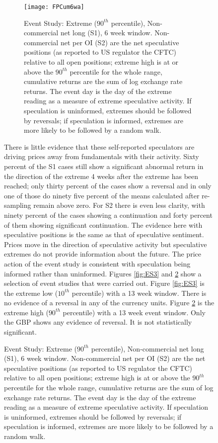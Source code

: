 \documentclass[ijfs,article,submit,oneauthor,pdftex,10pt,a4paper]{mdpi}
\begin{document}
{\begin{figure}
\begin{figure}
\graphicspath{{../Figures/}}
\centering
\texttt{[image: FPCum6wa]}
\caption{Event Study:  Extreme ($90^{th}$ percentile), Non-commercial net long (S1), 6 week window. Non-commercial net per OI (S2) are the net speculative positions (as reported to US regulator the CFTC) relative to all open positions; extreme high is at or above the $90^{th}$ percentile for the whole range, cumulative returns are the sum of log exchange rate returns. The event day is the day of the extreme reading as a measure of extreme speculative activity.  If speculation is uninformed, extremes should be followed by reversals; if speculation is informed, extremes are more likely to be followed by a random walk.}

\label{fig:ES4}
\end{figure}

There is little evidence that these self-reported speculators are driving prices away from fundamentals with their activity. Sixty percent of the S1 cases still show a significant abnormal return in the direction of the extreme 4 weeks after the extreme has been reached; only thirty percent of the cases show a reversal and in only one of those do ninety five percent of the means calculated after re-sampling remain above zero.  For S2 there is even less clarity, with ninety percent of the cases showing a continuation and forty percent of them showing significant continuation.  The evidence here with speculative positions is the same as that of speculative sentiment.  Prices move in the direction of speculative activity but speculative extremes do not provide information about the future. The price action of the event study is consistent with speculation being informed rather than uninformed.  Figures \ref{fig:ES3} and \ref{fig:ES4} show a selection of event studies that were carried out.  Figure \ref{fig:ES3} is the extreme low ($10^{th}$ percentile) with a 13 week window. There is no evidence of a reversal in any of the currency units.   Figure \ref{fig:ES4} is the extreme high ($90^{th}$ percentile) with a 13 week event window.  Only the GBP shows any evidence of reversal. It is not statistically significant. 



\end{figure}}
\end{document}
